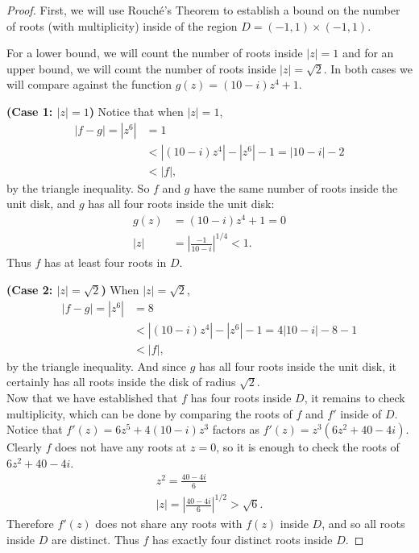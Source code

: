 \documentclass{article}
\begin{document}
\begin{proof}
  First, we will use Rouch\'e's Theorem to establish a bound on the number of
  roots (with multiplicity) inside of the region $D = (-1, 1)\times(-1,1)$.

  For a lower bound, we will count the number of roots inside $|z| = 1$ and
  for an upper bound, we will count the number of roots inside $|z| = \sqrt2$.
  In both cases we will compare against the function $g(z) = (10 - i)z^4 + 1$.

  \textbf{(Case 1: $|z| = 1$)} Notice that when $|z| = 1$, \begin{align*}
    |f - g| = |z^6| &= 1\\
    &< |(10 - i)z^4| - |z^6| - 1 = |10 - i| - 2 \\
    &< |f|,
  \end{align*} by the triangle inequality.
  So $f$ and $g$ have the same number of roots inside the unit disk, and $g$
  has all four roots inside the unit disk: \begin{align*}
    g(z) &= (10 - i)z^4 + 1 = 0 \\
    |z| &= \left|\frac{-1}{10 - i}\right|^{1/4} < 1.
  \end{align*}
  Thus $f$ has at least four roots in $D$.

  \textbf{(Case 2: $|z| = \sqrt2$)} When $|z| = \sqrt2$, \begin{align*}
  |f - g| = |z^6| &= 8\\
  &< |(10 - i)z^4| - |z^6| - 1 = 4|10 - i| - 8 - 1 \\
  &< |f|,
  \end{align*} by the triangle inequality.
  And since $g$ has all four roots inside the unit disk, it certainly has
  all roots inside the disk of radius $\sqrt2$.
  \\
  Now that we have established that $f$ has four roots inside $D$, it remains
  to check multiplicity, which can be done by comparing the roots of $f$
  and $f'$ inside of $D$.
  \\
  Notice that $f'(z) = 6z^5 + 4(10 - i)z^3$ factors as
  $f'(z) = z^3(6z^2 + 40 - 4i)$. Clearly $f$ does not have any roots at $z = 0$,
  so it is enough to check the roots of $6z^2 + 40 - 4i$. \begin{align*}
  z^2 = \frac{40 - 4i}{6} \\
  |z| = \left|\frac{40 - 4i}{6}\right|^{1/2} > \sqrt6.
  \end{align*}
  Therefore $f'(z)$ does not share any roots with $f(z)$ inside $D$, and so
  all roots inside $D$ are distinct. Thus $f$ has exactly four distinct roots
  inside $D$.
\end{proof}
\end{document}
